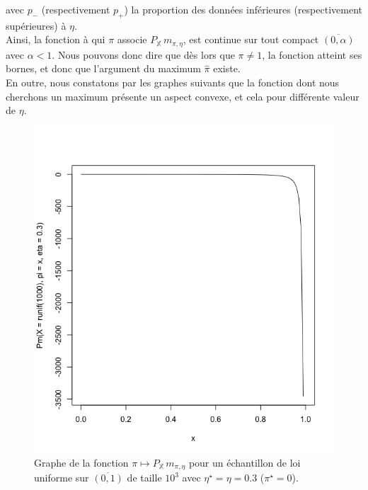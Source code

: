 \documentclass{article}
\begin{document}
    \vspace*{0.3cm}
    avec $p_-$ (respectivement $p_+$) la proportion des données inférieures (respectivement supérieures) à $\eta$.\\

    Ainsi, la fonction à qui $\pi$ associe $P_\mathbb{X}\,m_{\pi,\eta}$, est continue sur tout compact $\overline{(0,\alpha)}$ avec $\alpha<1$. Nous pouvons donc dire que dès lors que $\pi\neq{}1$, la fonction atteint ses bornes, et donc que l'argument du maximum $\hat\pi$ existe. \\

    En outre, nous constatons par les graphes suivants que la fonction dont nous cherchons un maximum présente un aspect convexe, et cela pour différente valeur de $\eta$. \\

    \begin{figure}[H]
        \centering
        \includegraphics[scale=0.5]{img/Pm_1.png}
        \caption{Graphe de la fonction $\pi\mapsto{}P_\mathbb{X}\,m_{\pi,\eta}$ pour un échantillon de loi uniforme sur $\overline{(0,1)}$ de taille $10^3$ avec $\eta^\star=\eta=0.3$ ($\pi^\star=0$).}
    \end{figure}
\end{document}
